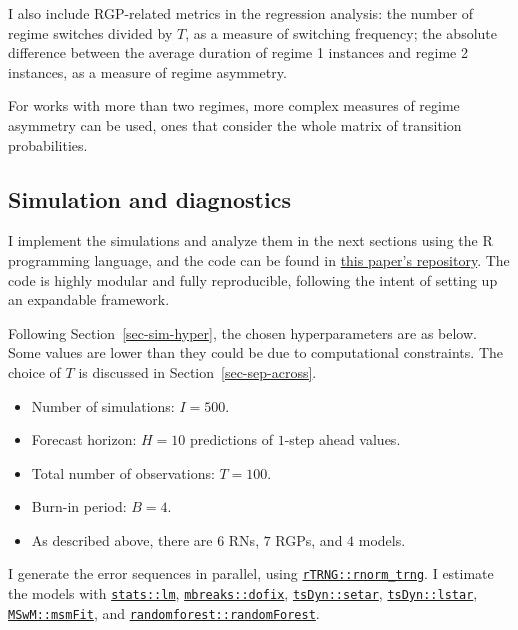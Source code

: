 \documentclass[
  letterpaper,
  DIV=11,
  numbers=noendperiod]{scrartcl}
\providecommand{\tightlist}{%
  \setlength{\itemsep}{0pt}\setlength{\parskip}{0pt}}\usepackage{longtable,booktabs,array}
\numberwithin{equation}{section}
\numberwithin{table}{section}
\numberwithin{figure}{section}
\begin{document}
I also include RGP-related metrics in the regression analysis: the
number of regime switches divided by \(T\), as a measure of switching
frequency; the absolute difference between the average duration of
regime 1 instances and regime 2 instances, as a measure of regime
asymmetry.

For works with more than two regimes, more complex measures of regime
asymmetry can be used, ones that consider the whole matrix of transition
probabilities.

\subsection{Simulation and diagnostics}\label{sec-impl-diag}

I implement the simulations and analyze them in the next sections using
the R programming language, and the code can be found in
\href{https://github.com/ricardo-semiao/article-regime-id-performance}{this
paper's repository}. The code is highly modular and fully reproducible,
following the intent of setting up an expandable framework.

Following Section~\ref{sec-sim-hyper}, the chosen hyperparameters are as
below. Some values are lower than they could be due to computational
constraints. The choice of \(T\) is discussed in
Section~\ref{sec-sep-across}.

\begin{itemize}
\tightlist
\item
  Number of simulations: \(I = 500\).
\item
  Forecast horizon: \(H = 10\) predictions of \(1\)-step ahead values.
\item
  Total number of observations: \(T = 100\).
\item
  Burn-in period: \(B = 4\).
\item
  As described above, there are \(6\) RNs, \(7\) RGPs, and \(4\) models.
\end{itemize}

I generate the error sequences in parallel, using
\href{https://github.com/cran/rTRNG}{\texttt{rTRNG::rnorm\_trng}}. I
estimate the models with
\href{https://github.com/SurajGupta/r-source/tree/master/src/library/stats}{\texttt{stats::lm}},
\href{https://github.com/cran/mbreaks}{\texttt{mbreaks::dofix}},
\href{https://github.com/cran/tsDyn}{\texttt{tsDyn::setar}},
\href{https://github.com/cran/tsDyn}{\texttt{tsDyn::lstar}},
\href{https://github.com/cran/MSwM}{\texttt{MSwM::msmFit}}, and
\href{https://github.com/cran/randomforest}{\texttt{randomforest::randomForest}}.
\end{document}
